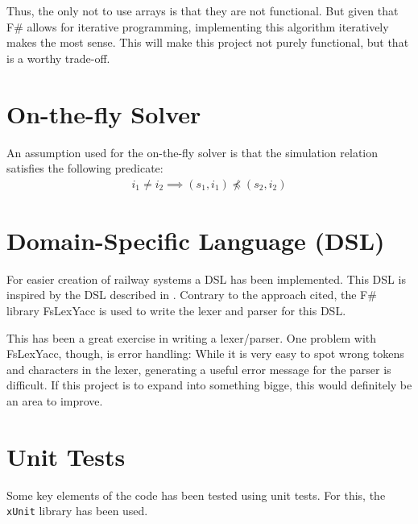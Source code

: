 Thus, the only not to use arrays is that they are not functional. But given that
F\# allows for iterative programming, implementing this algorithm iteratively
makes the most sense. This will make this project not purely functional, but
that is a worthy trade-off. 

\section{On-the-fly Solver} 

An assumption used for the on-the-fly solver is that the simulation relation
satisfies the following predicate: 
\begin{align}
  i_1 \neq i_2 \implies (s_1, i_1) \not \preceq (s_2, i_2)
\end{align}


\section{Domain-Specific Language (DSL)} %

For easier creation of railway systems a DSL has been implemented. This DSL is
inspired by the DSL described in \cite{kastingSystemSynthesisUsing2016}. Contrary to the approach
cited, the F\# library FsLexYacc is used to write the lexer and parser for this
DSL. 

This has been a great exercise in writing a lexer/parser. One problem with
FsLexYacc, though, is error handling: While it is very easy to spot wrong tokens
and characters in the lexer, generating a useful error message for the parser is
difficult. If this project is to expand into something bigge, this would
definitely be an area to improve. 


\section{Unit Tests} %

Some key elements of the code has been tested using unit tests. For this, the
\texttt{xUnit} library has been used.  

